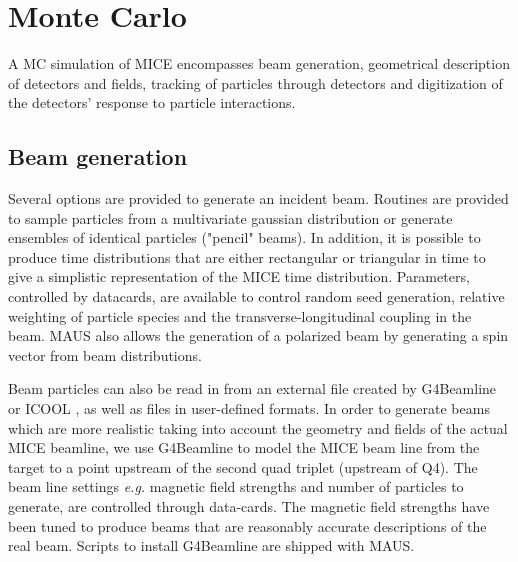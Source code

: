 \documentclass{JINST}
\begin{document}

\section{Monte Carlo}\label{sec:mc}
A MC simulation of MICE encompasses beam generation, geometrical description of detectors  and fields, tracking of particles through detectors and digitization of the detectors' response to particle interactions. 

\subsection{Beam generation}\label{sec:beam}
Several options are provided to generate an incident beam.  Routines are provided to sample particles from a multivariate gaussian distribution or generate ensembles of identical particles ("pencil" beams). In addition, it is possible to produce time distributions that are either rectangular or triangular in time to give a simplistic representation of the MICE time distribution. Parameters, controlled by datacards, are available to control random seed generation,  relative weighting of particle species and the transverse-longitudinal coupling in the beam. MAUS also allows the generation of a polarized beam by generating a spin vector from beam distributions. 

Beam particles can also be read in from an external file created by G4Beamline \cite{G4Beamline} or ICOOL \cite{ICOOL}, as well as files in user-defined formats. In order to generate beams which are more realistic taking into account the geometry and fields of the actual MICE beamline, we use G4Beamline to model the MICE beam line from the target to a point upstream of the second quad triplet (upstream of Q4).  The beam line settings \textit{e.g.} magnetic field strengths and number of particles to generate, are controlled through data-cards. The magnetic field strengths have been tuned to produce beams that are reasonably accurate descriptions of the real beam. Scripts to install G4Beamline are shipped with MAUS. 
\end{document}

